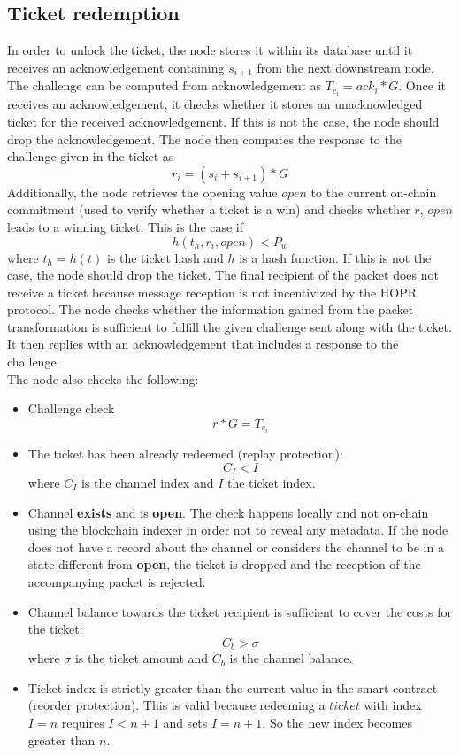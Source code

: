\subsection{Ticket redemption}


In order to unlock the ticket, the node stores it within its database until it receives an acknowledgement containing $s_{i+1}$ from the next downstream node.
The challenge can be computed from acknowledgement as $T_{c_i}=ack_i*G$.
\newline Once it receives an acknowledgement, it checks whether it stores an unacknowledged ticket for the received acknowledgement.
If this is not the case, the node should drop the acknowledgement.
\newline The node then computes the response to the challenge given in the ticket as $$r_i=(s_i+s_{i+1})*G$$
Additionally, the node retrieves the opening value $open$ to the current on-chain commitment (used to verify whether a ticket is a win) and checks whether $r$, $open$ leads to a winning ticket.
This is the case if $$h(t_h, r_i, open ) <P_w$$ where $t_h=h(t)$ is the ticket hash and $h$ is a hash function.
If this is not the case, the node should drop the ticket.
The final recipient of the packet does not receive a ticket because message reception is not incentivized by the HOPR protocol.
\newline The node checks whether the information gained from the packet transformation is sufficient to fulfill the given challenge sent along with the ticket. It then replies with an acknowledgement that includes a response to the challenge.
\\ The node also checks the following:
\begin{itemize}
    \item Challenge check $$r*G=T_{c_i}$$
    \item The ticket has been already redeemed (replay protection): $$C_I <I$$ where $C_I$ is the channel index and $I$ the ticket index.
    \item Channel \textbf{exists} and is \textbf{open}. The check happens locally and not on-chain using the blockchain indexer in order not to reveal any metadata. If the node does not have a record about the channel or considers the channel to be in a state different from \textbf{open}, the ticket is dropped and the reception of the accompanying packet is rejected.
    \item Channel balance towards the ticket recipient is sufficient to cover the costs for the ticket: $$ C_b>\sigma$$ where $\sigma$ is the ticket amount and $C_b$ is the channel balance.
    \item Ticket index is strictly greater than the current value in the smart contract (reorder protection). This is valid because redeeming a $ticket$ with index $I=n$ requires $I < n+1$ and sets $I= n+1$. So the new index becomes greater than $n$.


\end{itemize}









